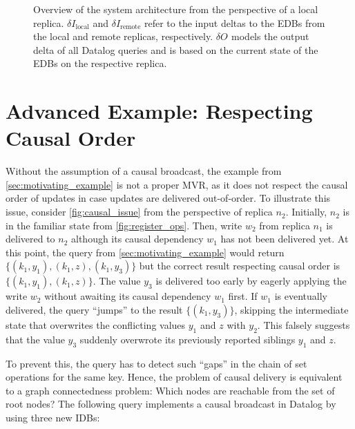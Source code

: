 \documentclass{article}
\newcommand{\deltaI}[1]{\(\delta I_{\text{#1}}\)}
\newcommand{\deltaO}[1][]{\(\delta O_{\text{#1}}\)}
\begin{document}
\begin{figure*}

	\caption{
		Overview of the system architecture from the perspective of a local
		replica.
		\deltaI{local} and \deltaI{remote} refer to the input deltas to
		the EDBs from the local and remote replicas, respectively.
		\deltaO{} models the output delta of all Datalog queries and is based on
		the current state of the EDBs on the respective replica.
	}\label{fig:system_overview}
\end{figure*}

\section{Advanced Example: Respecting Causal Order}
\label{sec:advanced_example}

Without the assumption of a causal broadcast,
the example from \autoref{sec:motivating_example} is not a proper MVR,
as it does not respect the causal order of updates in case updates are delivered
out-of-order.
To illustrate this issue, consider \autoref{fig:causal_issue} from the
perspective of replica \(n_2\).
Initially, \(n_2\) is in the familiar state from \autoref{fig:register_ops}.
Then, write \(w_2\) from replica \(n_1\) is delivered to \(n_2\) although its
causal dependency \(w_1\) has not been delivered yet.
At this point, the query from \autoref{sec:motivating_example} would return
\(\{ (k_1, y_1), (k_1, z), (k_1, y_3)\} \)
but the correct result respecting causal order is
\(\{ (k_1, y_1), (k_1, z) \}\).
The value \(y_3\) is delivered too early by eagerly applying the write \(w_2\)
without awaiting its causal dependency \(w_1\) first.
If \(w_1\) is eventually delivered, the query ``jumps'' to the result
\( \{ (k_1, y_3) \} \), skipping the intermediate state
that overwrites the conflicting values \(y_1\) and \(z\) with \(y_2\).
This falsely suggests that the value \(y_3\) suddenly overwrote its previously
reported siblings \(y_1\) and \(z\).

To prevent this, the query has to detect such ``gaps'' in the chain of set
operations for the same key.
Hence, the problem of causal delivery is equivalent to a graph connectedness
problem: Which nodes are reachable from the set of root nodes?
The following query implements a causal broadcast in Datalog by using
three new IDBs:
\end{document}

